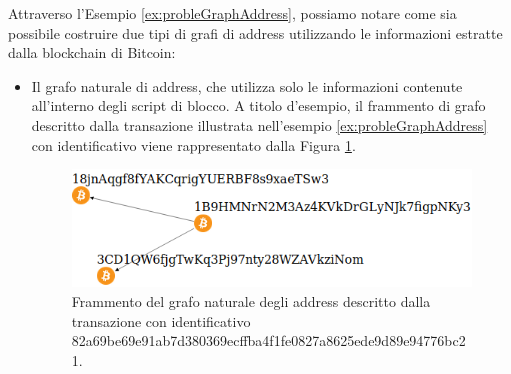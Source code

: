  Attraverso l'Esempio \ref{ex:probleGraphAddress}, possiamo notare come sia possibile costruire due tipi di grafi di address utilizzando le informazioni estratte dalla blockchain di Bitcoin:
 \begin{itemize}
   \item Il grafo naturale di address, che utilizza solo le informazioni contenute all'interno degli script di blocco. A titolo d'esempio, il frammento di grafo descritto dalla transazione illustrata nell'esempio \ref{ex:probleGraphAddress} con  identificativo  viene rappresentato dalla Figura \ref{fig:addGrapjNatural}.
   \begin{figure}[H]
   \centering
   \includegraphics[scale=0.35]{images/exampleWithGraph/naturalAddressGrahScamTx.png}
   \caption{Frammento del grafo naturale degli address descritto dalla transazione con identificativo 82\-a69\-be69e\-91ab7\-d3803\-69ec\-ffba4f\-1fe08\-27a862\-5ede9\-d89e9\-4776b\-c21.\label{fig:addGrapjNatural}}
   \end{figure}


\end{itemize}
